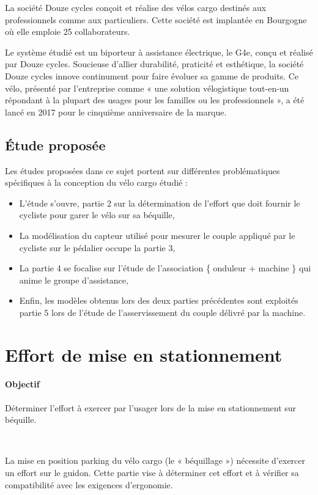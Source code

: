 La société Douze cycles conçoit et réalise des vélos cargo destinés aux professionnels comme aux particuliers.
Cette société est implantée en Bourgogne où elle emploie 25 collaborateurs.

Le système étudié est un biporteur à assistance électrique, le G4e, conçu et réalisé par Douze cycles. Soucieuse d'allier durabilité, praticité et esthétique, la société Douze cycles innove continument pour faire évoluer sa gamme de produits. Ce vélo, présenté par l'entreprise comme « une solution vélogistique tout-en-un répondant à la plupart des usages pour les familles ou les professionnels », a été lancé en 2017 pour le cinquième anniversaire de la marque.

\subsection{Étude proposée}

Les études proposées dans ce sujet portent sur différentes problématiques spécifiques à la conception du vélo
cargo étudié :
\begin{itemize}
 \item L'étude s'ouvre, partie 2 sur la détermination de l'effort que doit fournir le cycliste pour garer le vélo sur sa béquille,
 \item La modélisation du capteur utilisé pour mesurer le couple appliqué par le cycliste sur le pédalier occupe la partie 3,
 \item La partie 4 se focalise sur l'étude de l'association \{ onduleur + machine \} qui anime le groupe d'assistance,
 \item Enfin, les modèles obtenus lors des deux parties précédentes sont exploités partie 5 lors de l'étude de
l'asservissement du couple délivré par la machine.
\end{itemize}

\section{Effort de mise en stationnement}

\paragraph{Objectif} Déterminer l'effort à exercer par l'usager lors de la mise en stationnement sur béquille.

~\

La mise en position parking du vélo cargo (le « béquillage ») nécessite d'exercer un effort sur le guidon. Cette partie vise à déterminer cet effort et à vérifier sa compatibilité avec les exigences d'ergonomie.

